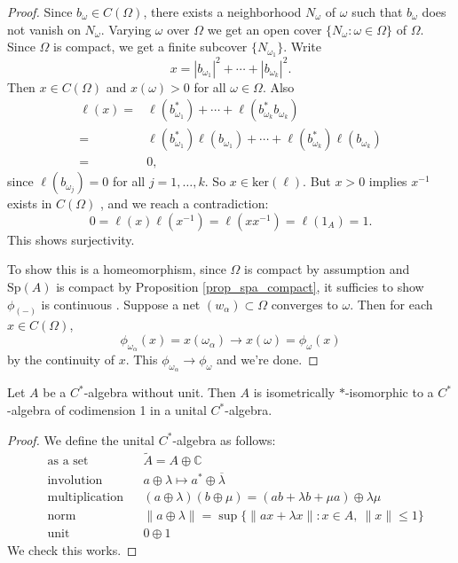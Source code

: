 \documentclass[12pt]{article}
\begin{document}
\begin{proof}
	Since $b_\omega\in C(\Omega)$, there exists a neighborhood $N_\omega$ of $\omega$ such that $b_\omega$ does not vanish on $N_\omega$. Varying $\omega$ over $\Omega$ we get an open cover $\{N_\omega : \omega\in\Omega\}$ of $\Omega$. Since $\Omega$ is compact, we get a finite subcover $\{N_{\omega_1}\}$. Write 
	\begin{equation*}
		x = |b_{\omega_1}|^2 + \cdots + |b_{\omega_k}|^2.
	\end{equation*}
	Then $x\in C(\Omega)$ and $x(\omega)>0$ for all $\omega\in\Omega$. Also 
	\begin{align*}
		\ell(x) 
		=& \ell(b^\ast_{\omega_1}) + \cdots + \ell(b^\ast_{\omega_k}b_{\omega_k}) \\
		=& \ell(b^\ast_{\omega_1})\ell(b_{\omega_1}) + \cdots + \ell(b^\ast_{\omega_k})\ell(b_{\omega_k}) \\
		=& 0,
	\end{align*}
	since $\ell(b_{\omega_j})=0$ for all $j=1,\dots,k$. So $x\in\text{ker}(\ell)$. But $x>0$ implies $x^{-1}$ exists in $C(\Omega)$ , and we reach a contradiction:
	\begin{equation*}
		0 = \ell(x)\ell(x^{-1})=\ell(xx^{-1})=\ell(1_A)=1.
	\end{equation*}
	This shows surjectivity.

	To show this is a homeomorphism, since $\Omega$ is compact by assumption and $\text{Sp}(A)$ is compact by Proposition \ref{prop_spa_compact}, it sufficies to show $\phi_{(-)}$ is continuous . Suppose a net $(w_\alpha)\subset\Omega$ converges to $\omega$. Then for each $x\in C(\Omega)$, 
	\begin{equation*}
		\phi_{\omega_\alpha}(x) = x(\omega_\alpha) \to x(\omega) = \phi_\omega(x)
	\end{equation*}
	by the continuity of $x$. This $\phi_{\omega_\alpha}\to\phi_\omega$ and we're done.
\end{proof}

\begin{theorem}[unitization]
\label{thm_cstar_unitization}
	Let $A$ be a $C^\ast$-algebra without unit. Then $A$ is isometrically $\ast$-isomorphic to a $C^\ast$-algebra of codimension 1 in a unital $C^\ast$-algebra.
\end{theorem}
\begin{proof}
	We define the unital $C^\ast$-algebra as follows: 
	\begin{align*}
		&\text{as a set}  &&\tilde{A} = A \oplus\mathbb{C} \\
		&\text{involution}  &&a\oplus\lambda\mapsto a^\ast\oplus\overline{\lambda} \\
		&\text{multiplication}  &&(a\oplus\lambda)(b\oplus\mu) = (ab+\lambda b + \mu a) \oplus \lambda \mu \\
		&\text{norm}  &&\|a\oplus\lambda\| = \sup\{\|ax+\lambda x\| : x\in A, \ \|x\|\leq 1\} \\
		&\text{unit}  &&0\oplus 1
	\end{align*}
	We check this works. 
\end{proof}
\end{document}
